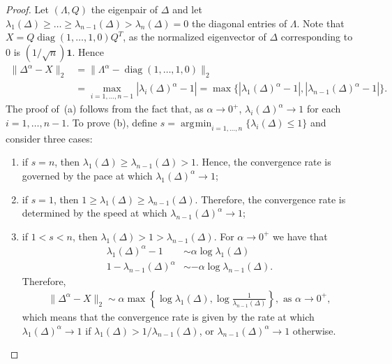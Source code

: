 \documentclass[a4paper,12pt]{article}
\DeclareMathOperator{\diag}{diag}
\DeclareMathOperator*{\argmin}{\arg\!\min}
\newcommand{\fL}{\Delta^\alpha}
\begin{document}
\begin{proof}
Let $(\Lambda,Q)$ the eigenpair of $\Delta$ and let $\lambda_1(\Delta)\geq \dots \geq \lambda_{n-1}(\Delta)>\lambda_{n}(\Delta)=0$ the diagonal entries of $\Lambda$. Note that $X = Q \diag(1, \dots, 1, 0)Q^T$, as the normalized eigenvector of $\Delta$ corresponding to 0 is $(1/\sqrt{n})\mathbf{1}$. Hence
\begin{align*} \|\fL - X\|_2 &= \|\Lambda^\alpha - \diag(1, \dots, 1, 0)\|_2 \\
&=
\max_{i=1,...,n-1}{|\lambda_i(\Delta)^\alpha - 1|} = \max\{|\lambda_1(\Delta)^\alpha - 1|, |\lambda_{n-1}(\Delta)^\alpha
 - 1|\}.
\end{align*}
 The proof of~(a) follows from the fact that, as $\alpha\rightarrow0^+$, $\lambda_i(\Delta)^\alpha\rightarrow 1$ for each $i=1,\dots,n-1$. To prove (b), define $s=\argmin_{i=1,\dots,n}\{\lambda_{i}(\Delta)\leq1\}$ and consider three cases:
\begin{enumerate}
    \item if $s=n$, then $\lambda_{1}(\Delta)\geq\lambda_{n-1}(\Delta)>1$. Hence, the convergence rate is governed by the pace at which $\lambda_{1}(\Delta)^\alpha\rightarrow1$;
    \item if $s=1$, then $1\geq \lambda_{1}(\Delta)\geq\lambda_{n-1}(\Delta)$. Therefore, the convergence rate is determined by the speed at which
    $\lambda_{{n-1}}(\Delta)^\alpha\rightarrow1$;
    \item if $1< s < n$, then $\lambda_1(\Delta)>1>\lambda_{n-1}(\Delta)$.
    For $\alpha\rightarrow0^+$ we have that 
    \begin{align*}
        \lambda_{1}(\Delta)^{\alpha} -1 &\sim \alpha \log \lambda_1(\Delta)\\
        1- \lambda_{n-1}(\Delta)^{\alpha} &\sim -\alpha \log \lambda_{n-1}(\Delta).
    \end{align*}
    Therefore,
    \begin{align*}
        \|\Delta^\alpha-X\|_2\sim \alpha \max\left\{\log \lambda_1(\Delta),\log\frac{1}{\lambda_{n-1}(\Delta)}\right\}, \text{ as } \alpha\rightarrow0^+,
    \end{align*}
    which means that the convergence rate is given by the rate at which $\lambda_{{1}}(\Delta)^\alpha\rightarrow1$ if $\lambda_1(\Delta)>1/\lambda_{{n-1}}(\Delta)$, or $\lambda_{{n-1}}(\Delta)^\alpha\rightarrow1$ otherwise. 
\end{enumerate}
\end{proof}
\end{document}
